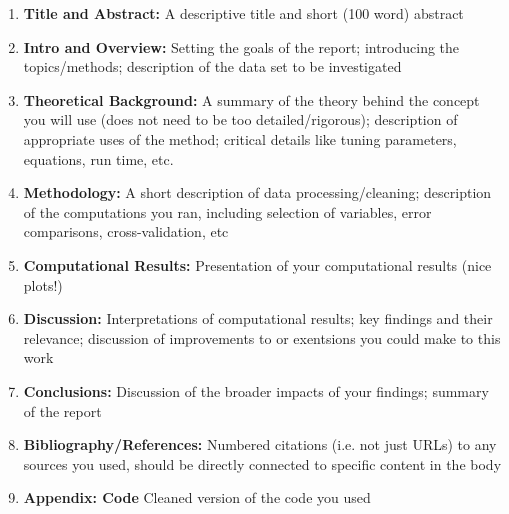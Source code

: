 \documentclass[16pt]{article}
\begin{document}
	\begin{enumerate}\setlength{\itemsep}{-1pt}
		\item[] \textbf{Title and Abstract:} A descriptive title and short (100 word) abstract
		\item[]\textbf{Intro and Overview:} Setting the goals of the report; introducing the topics/methods; description of the data set to be investigated
		\item[]\textbf{Theoretical Background:} A summary of the theory behind the concept you will use (does not need to be too detailed/rigorous); description of appropriate uses of the method; critical details like tuning parameters, equations, run time, etc.
		\item[]\textbf{Methodology:} A short description of data processing/cleaning; description of the computations you ran, including selection of variables, error comparisons, cross-validation, etc
		\item[]\textbf{Computational Results:} Presentation of your computational results (nice plots!)
		\item[] \textbf{Discussion:} Interpretations of computational results; key findings and their relevance; discussion of improvements to or exentsions you could make to this work
		\item[] \textbf{Conclusions:} Discussion of the broader impacts of your findings; summary of the report
		\item[] \textbf{Bibliography/References:} Numbered citations (i.e. not just URLs) to any sources you used, should be directly connected to specific content in the body 
		\item[] \textbf{Appendix: Code} Cleaned version of the code you used 
	\end{enumerate}
	
	
	
\end{document}
